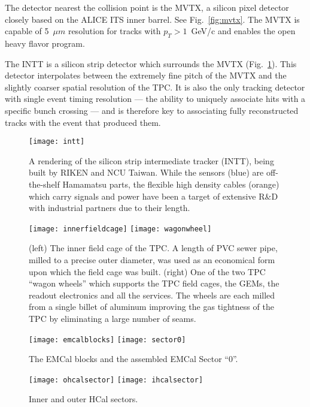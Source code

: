The detector nearest the collision point is the MVTX, a silicon pixel
detector closely based on the ALICE ITS inner barrel.  See
Fig.~\ref{fig:mvtx}.  The MVTX is capable of 5~$\mu m$ resolution for
tracks with $p_T > 1$~GeV/c and enables the open heavy flavor program.

The INTT is a silicon strip detector which surrounds the MVTX
(Fig.~\ref{fig:intt}).  This detector interpolates between the
extremely fine pitch of the MVTX and the slightly coarser spatial
resolution of the TPC.  It is also the only tracking detector with
single event timing resolution --- the ability to uniquely associate
hits with a specific bunch crossing --- and is therefore key to
associating fully reconstructed tracks with the event that produced
them.

\begin{figure}[hbt!]
  \centering
  \texttt{[image: intt]}
  \caption{A rendering of the silicon strip intermediate tracker
    (INTT), being built by RIKEN and NCU Taiwan.  While the sensors
    (blue) are off-the-shelf Hamamatsu parts, the flexible high
    density cables (orange) which carry signals and power have been a
    target of extensive R\&D with industrial partners due to their
    length.}
  \label{fig:intt}
\end{figure}


\begin{figure}[hbt!]
  \centering
  \texttt{[image: innerfieldcage]}
  \hfill
  \texttt{[image: wagonwheel]}
  \caption{(left) The inner field cage of the TPC. A length of PVC
    sewer pipe, milled to a precise outer diameter, was used as an
    economical form upon which the field cage was built.  (right) One
    of the two TPC ``wagon wheels'' which supports the TPC field
    cages, the GEMs, the readout electronics and all the services.
    The wheels are each milled from a single billet of aluminum
    improving the gas tightness of the TPC by eliminating a large
    number of seams.}
  \label{fig:wagonwheel}
\end{figure}

\begin{figure}[hbt!]
  \centering
  \texttt{[image: emcalblocks]}
  \hfill
  \texttt{[image: sector0]}
  \caption{The EMCal blocks and the assembled EMCal Sector ``0''.}
  \label{fig:emcal}
\end{figure}

\begin{figure}[hbt!]
  \centering
  \texttt{[image: ohcalsector]}
  \hfill
  \texttt{[image: ihcalsector]}
  \caption{Inner and outer HCal sectors.}
  \label{fig:hcal}
\end{figure}

